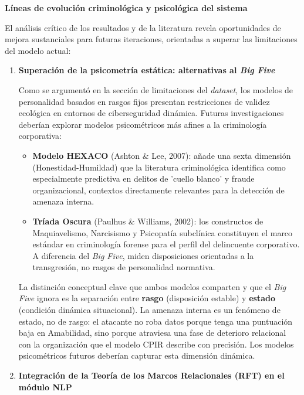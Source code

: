 \documentclass[IB]{TFUOC}%
\begin{document}
\medskip
\noindent\textbf{Líneas de evolución criminológica y psicológica del sistema}

\medskip
\noindent El análisis crítico de los resultados y de la literatura revela 
oportunidades de mejora sustanciales para futuras iteraciones, orientadas 
a superar las limitaciones del modelo actual:

\begin{enumerate}

    \item \textbf{Superación de la psicometría estática: alternativas 
    al \textit{Big Five}}
    
    Como se argumentó en la sección de limitaciones del \textit{dataset}, los modelos de personalidad basados en rasgos fijos presentan restricciones de validez ecológica en entornos de ciberseguridad dinámica. Futuras investigaciones deberían explorar modelos psicométricos más afines a la criminología corporativa:

    \begin{itemize}
        \item \textbf{Modelo HEXACO} (Ashton \& Lee, 2007): añade una sexta dimensión (Honestidad-Humildad) que la literatura criminológica identifica como especialmente predictiva en delitos de 'cuello blanco' y fraude organizacional, contextos directamente relevantes para la detección de amenaza interna.
        
        \item \textbf{Tríada Oscura} (Paulhus \& Williams, 2002): los constructos de Maquiavelismo, Narcisismo y Psicopatía subclínica constituyen el marco estándar en criminología forense para el perfil del delincuente corporativo. A diferencia del \textit{Big Five}, miden disposiciones orientadas a la transgresión, no rasgos de personalidad normativa.
    \end{itemize}
    
    \noindent La distinción conceptual clave que ambos modelos comparten y que el \textit{Big Five} ignora es la separación entre \textbf{rasgo} (disposición estable) y \textbf{estado} (condición dinámica situacional). La amenaza interna es un fenómeno de estado, no de rasgo: el atacante no roba datos porque tenga una puntuación baja en Amabilidad, sino porque atraviesa una fase de deterioro relacional con la organización que el modelo CPIR describe con precisión. Los modelos psicométricos futuros deberían capturar esta dimensión dinámica.

    \item \textbf{Integración de la Teoría de los Marcos Relacionales (RFT) en el módulo NLP}
    

\end{enumerate}
\end{document}
